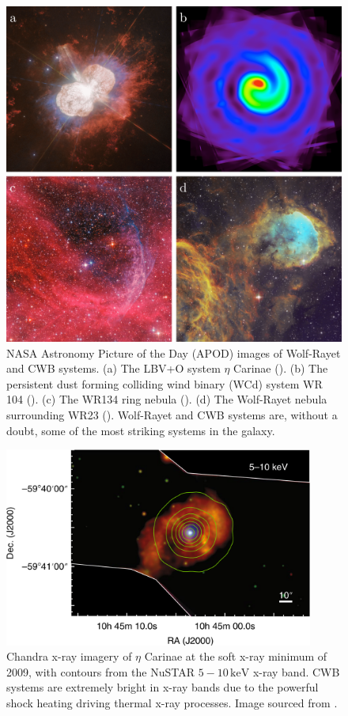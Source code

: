 \begin{figure}[H]
  \centering
  \includegraphics[width=5in]{assets/wolf-rayets/wolf-rayets.png}
  \caption[\emph{NASA APOD images of Wolf-Rayet and CWB systems}]{NASA Astronomy Picture of the Day (APOD) images of Wolf-Rayet and CWB systems. (a) The LBV+O system $\eta$ Carinae (). (b) The persistent dust forming colliding wind binary (WCd) system WR 104 (). (c) The WR134 ring nebula (). (d) The Wolf-Rayet nebula surrounding WR23 (). Wolf-Rayet and CWB systems are, without a doubt, some of the most striking systems in the galaxy.}
  \label{fig:cwbexamples}
\end{figure}

\begin{figure}[h]
  \centering
  \includegraphics[width=4in]{assets/wolf-rayets/x-ray.png}
  \caption[\emph{Chandra \& NuSTAR imagery of $\eta$ Carinae \parencite{hamaguchiNonthermalXraysColliding2018}}]{Chandra x-ray imagery of $\eta$ Carinae at the soft x-ray minimum of 2009, with contours from the NuSTAR $5-10 \, \si{\kilo\electronvolt}$ x-ray band. CWB systems are extremely bright in x-ray bands due to the powerful shock heating driving thermal x-ray processes. Image sourced from \textcite{hamaguchiNonthermalXraysColliding2018}.}
  \label{fig:intro-xray}
\end{figure}

